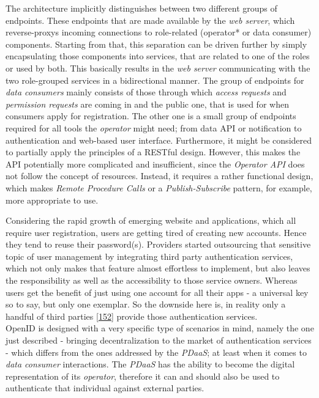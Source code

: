 \documentclass[12pt,english,a4paper,titlepage,cleardoublepage=empty,dottedtoc]{report}
\begin{document}
The architecture implicitly distinguishes between two different groups
of endpoints. These endpoints that are made available by the \emph{web
server}, which reverse-proxys incoming connections to role-related
(operator* or data consumer) components. Starting from that, this
separation can be driven further by simply encapsulating those
components into services, that are related to one of the roles or used
by both. This basically results in the \emph{web server} communicating
with the two role-grouped services in a bidirectional manner. The group
of endpoints for \emph{data consumers} mainly consists of those through
which \emph{access requests} and \emph{permission requests} are coming
in and the public one, that is used for when consumers apply for
registration. The other one is a small group of endpoints required for
all tools the \emph{operator} might need; from data API or notification
to authentication and web-based user interface. Furthermore, it might be
considered to partially apply the principles of a RESTful design.
However, this makes the API potentially more complicated and
insufficient, since the \emph{Operator API} does not follow the concept
of resources. Instead, it requires a rather functional design, which
makes \emph{Remote Procedure Calls} or a \emph{Publish-Subscribe}
pattern, for example, more appropriate to use.

Considering the rapid growth of emerging website and applications, which
all require user registration, users are getting tired of creating new
accounts. Hence they tend to reuse their password(s). Providers started
outsourcing that sensitive topic of user management by integrating third
party authentication services, which not only makes that feature almost
effortless to implement, but also leaves the responsibility as well as
the accessibility to those service owners. Whereas users get the benefit
of just using one account for all their apps - a universal key so to
say, but only one exemplar. So the downside here is, in reality only a
handful of third parties
{[}\protect\hyperlink{ref-web_2009-success-of-facebook-connect}{152}{]}
provide those authentication services.\\
OpenID is designed with a very specific type of scenarios in mind,
namely the one just described - bringing decentralization to the market
of authentication services - which differs from the ones addressed by
the \emph{PDaaS}; at least when it comes to \emph{data consumer}
interactions. The \emph{PDaaS} has the ability to become the digital
representation of its \emph{operator}, therefore it can and should also
be used to authenticate that individual against external parties.
\end{document}
